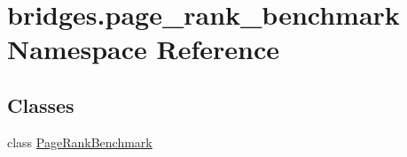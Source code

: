 \hypertarget{namespacebridges_1_1page__rank__benchmark}{}\section{bridges.\+page\+\_\+rank\+\_\+benchmark Namespace Reference}
\label{namespacebridges_1_1page__rank__benchmark}
\subsection*{Classes}
\begin{DoxyCompactItemize}
\item 
class \mbox{\hyperlink{classbridges_1_1page__rank__benchmark_1_1_page_rank_benchmark}{Page\+Rank\+Benchmark}}
\end{DoxyCompactItemize}
